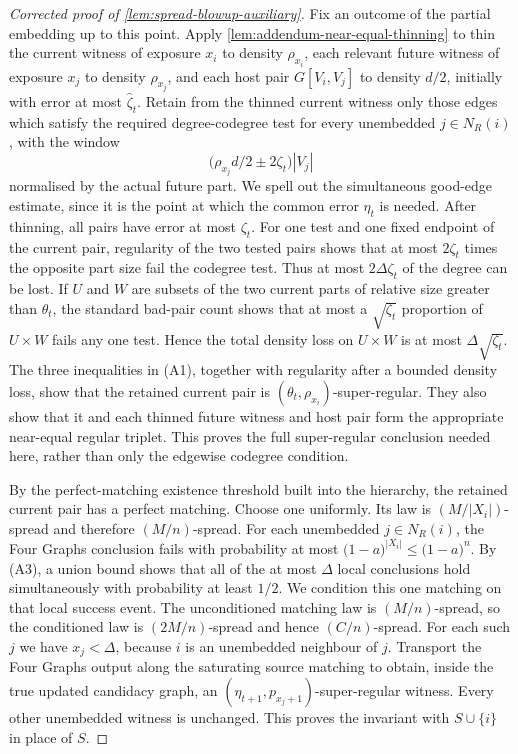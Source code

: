 \begin{proof}[Corrected proof of \cref{lem:spread-blowup-auxiliary}]
Fix an outcome of the partial embedding up to this point.  Apply
\cref{lem:addendum-near-equal-thinning} to thin the current witness of
exposure $x_i$ to density $\rho_{x_i}$, each relevant future witness of
exposure $x_j$ to density $\rho_{x_j}$, and each host pair $G[V_i,V_j]$ to
density $d/2$, initially with error at most $\widehat\zeta_t$.  Retain from
the thinned current witness
only those edges which satisfy the required degree-codegree test for every
unembedded $j\in N_R(i)$, with the window
\[
  \bigl(\rho_{x_j}d/2\pm2\zeta_t\bigr)|V_j|
\]
normalised by the actual future part.  We spell out the simultaneous
good-edge estimate,
since it is the point at which the common error $\eta_t$ is needed.  After
thinning, all pairs have error at most $\zeta_t$.  For one test and one fixed
endpoint of the current pair, regularity of the two tested pairs shows that
at most $2\zeta_t$ times the opposite part size fail the codegree test.  Thus
at most $2\Delta\zeta_t$ of the degree can be lost.  If $U$ and $W$ are
subsets of the two current parts of relative size greater than $\theta_t$,
the standard bad-pair count shows that at most a
$\sqrt{\zeta_t}$ proportion of $U\times W$ fails any one test.  Hence the
total density loss on $U\times W$ is at most
$\Delta\sqrt{\zeta_t}$.  The three inequalities in (A1), together with
regularity after a bounded density loss, show that the retained current pair
is $(\theta_t,\rho_{x_i})$-super-regular.  They also show that it and each
thinned future witness and host pair form the appropriate near-equal regular
triplet.  This proves the full super-regular conclusion needed here, rather
than only the edgewise codegree condition.

By the perfect-matching existence threshold built into the hierarchy, the
retained current pair has a perfect matching.  Choose one uniformly.  Its
law is $(M/|X_i|)$-spread and therefore $(M/n)$-spread.  For each
unembedded $j\in N_R(i)$, the Four Graphs conclusion fails with probability
at most $\bigl(1-a\bigr)^{|X_i|}\leq\bigl(1-a\bigr)^{n}$.  By (A3), a union
bound shows that all
of the at most $\Delta$ local conclusions hold simultaneously with
probability at least $1/2$.  We condition this one matching on that local
success event.  The unconditioned
matching law is $(M/n)$-spread, so the conditioned law is $(2M/n)$-spread and
hence $(C/n)$-spread.  For each such $j$ we have $x_j<\Delta$, because $i$
is an unembedded neighbour of $j$.  Transport the Four Graphs output
along the saturating source matching to obtain, inside the true updated
candidacy graph, an $(\eta_{t+1},p_{x_j+1})$-super-regular witness.  Every
other unembedded witness is unchanged.  This proves the invariant with
$S\cup\{i\}$ in place of $S$.


\end{proof}
